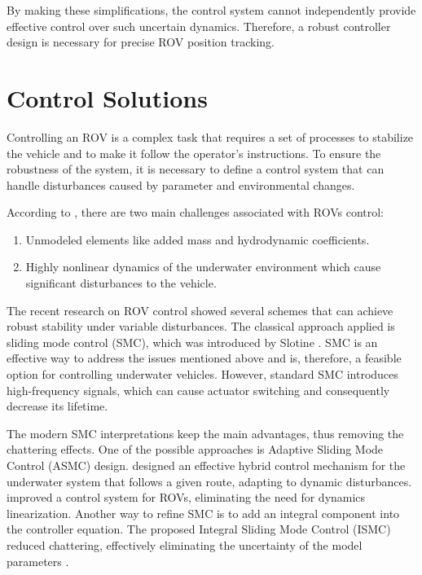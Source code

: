 By making these simplifications, the control system cannot independently provide effective control 
over such uncertain dynamics. Therefore, a robust controller design is necessary for precise ROV 
position tracking.

\section{Control Solutions}

Controlling an ROV is a complex task that requires a set of processes to stabilize the vehicle and 
to make it follow the operator's instructions. To ensure the robustness of the system, it is 
necessary to define a control system that can handle disturbances caused by parameter and 
environmental changes.

According to \cite{overview}, there are two main challenges associated with ROVs control:
\begin{enumerate}
\item Unmodeled elements like added mass and hydrodynamic coefficients.
\item Highly nonlinear dynamics of the underwater environment which cause significant disturbances to the vehicle.
\end{enumerate}

The recent research on ROV control showed several schemes that can achieve robust stability under 
variable disturbances. The classical approach applied is sliding mode control (SMC), which was 
introduced by Slotine \cite{slotine}. SMC is an effective way to address the issues mentioned above and is, 
therefore, a feasible option for controlling underwater vehicles. However,
standard SMC introduces high-frequency signals, which can cause actuator switching and consequently 
decrease its lifetime.

The modern SMC interpretations keep the main advantages, 
thus removing the chattering effects. One of the possible approaches is Adaptive Sliding Mode Control 
(ASMC) design. \cite{fossen:control} designed an effective hybrid control mechanism for the underwater system that 
follows a given route, adapting to dynamic disturbances. \cite{adaptive_smc} improved a control system for ROVs, 
eliminating the need for dynamics linearization. Another way to refine SMC is to add an integral 
component into the controller equation. The proposed Integral Sliding Mode Control (ISMC) reduced 
chattering, effectively eliminating the uncertainty of the model parameters \cite{integral_smc}.

